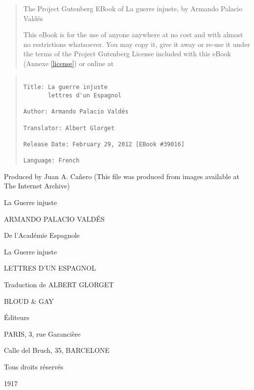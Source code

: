 \begin{quote}

The Project Gutenberg EBook of La guerre injuste, by Armando Palacio Valdés

This eBook is for the use of anyone anywhere at no cost and with
almost no restrictions whatsoever.  You may copy it, give it away or
re-use it under the terms of the Project Gutenberg License included
with this eBook (Annexe \ref{license}) or online at

\end{quote}

\vfill

\begin{quote}
\begin{verbatim}

Title: La guerre injuste
       lettres d'un Espagnol

Author: Armando Palacio Valdés

Translator: Albert Glorget

Release Date: February 29, 2012 [EBook #39016]

Language: French

\end{verbatim}
\end{quote}

\newpage

Produced by Juan A. Ca\~nero (This file was
produced from images available at The Internet Archive)

\vfill

La Guerre injuste

ARMANDO PALACIO VALDÉS

De l'Académie Espagnole

La Guerre injuste

LETTRES D'UN ESPAGNOL

Traduction de ALBERT GLORGET

BLOUD \& GAY

Éditeurs

PARIS, 3, rue Garancière

Calle del Bruch, 35, BARCELONE

Tous droits réservés

1917